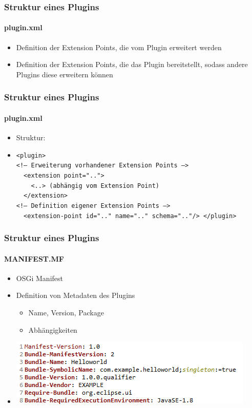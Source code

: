{\begin{frame}
  \frametitle{Struktur eines Plugins}
  \framesubtitle{plugin.xml}
  \begin{itemize}
  \item Definition der Extension Points, die vom Plugin erweitert werden
  \item Definition der Extension Points, die das Plugin bereitstellt, sodass andere Plugins diese erweitern können  
  \end{itemize}
\end{frame}

\begin{frame}
	\frametitle{Struktur eines Plugins}
	\framesubtitle{plugin.xml}
	\begin{itemize}
	\item Struktur:
	\item \texttt{<plugin>\\ \textless!-- Erweiterung vorhandener Extension Points --\textgreater\\ \ \ <extension point="..">\\ \ \ \ \ <..> (abhängig vom Extension Point)\\ \ \ </extension>\\ <!-- Definition eigener Extension Points -->\\ \ \ <extension-point id=".." name=".." schema=".."/> </plugin>}
	\end{itemize}
\end{frame}

\begin{frame}
  \frametitle{Struktur eines Plugins}
  \framesubtitle{MANIFEST.MF}
  \begin{itemize}
    \item OSGi Manifest
    \item Definition von Metadaten des Plugins
    \begin{itemize}
      \item Name, Version, Package
      \item Abhängigkeiten
    \end{itemize}
	\item \begin{minipage}{\linewidth}
		\includegraphics[scale=0.8]{images/manifest.png}
      \end{minipage}	 
  \end{itemize}
\end{frame}


}
